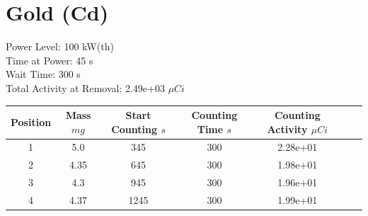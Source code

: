 \newpage

\section*{ Gold  (Cd) }

Power Level: 100 kW(th) \\
Time at Power: 45 s \\
Wait Time: 300 s \\
Total Activity at Removal: 2.49e+03 $\mu Ci$

\begin{table}[h]
\centering
\begin{tabular}{ |c|c|c|c|c|c|c| }
 \hline
 Position & Mass $mg$ & Start Counting $s$ & Counting Time $s$ & Counting Activity $\mu Ci$ \\
 \hline 
 1 & 5.0 & 345 & 300 & 2.28e+01\\ 
\hline
 2 & 4.35 & 645 & 300 & 1.98e+01\\ 
\hline
 3 & 4.3 & 945 & 300 & 1.96e+01\\ 
\hline
 4 & 4.37 & 1245 & 300 & 1.99e+01\\ 
\hline
\end{tabular}
\end{table}

